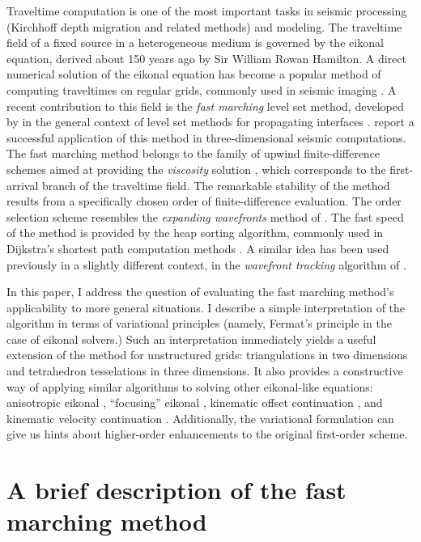 Traveltime computation is one of the most important tasks in seismic
processing (Kirchhoff depth migration and related methods) and modeling.  The
traveltime field of a fixed source in a heterogeneous medium is governed by
the eikonal equation, derived about 150 years ago by Sir William Rowan
Hamilton. A direct numerical solution of the eikonal equation has become a
popular method of computing traveltimes on regular grids, commonly used in
seismic imaging \cite[]{GEO55-05-05210526,GEO56-06-08120821,podvin.gji.91}. A
recent contribution to this field is the \emph{fast marching} level set
method, developed by \cite{paper2} in the general context of level set methods
for propagating interfaces \cite[]{osher,book}. \cite{mihai} report a
successful application of this method in three-dimensional seismic
computations. The fast marching method belongs to the family of upwind
finite-difference schemes aimed at providing the \emph{viscosity} solution
\cite[]{lions}, which corresponds to the first-arrival branch of the
traveltime field. The remarkable stability of the method results from a
specifically chosen order of finite-difference evaluation.  The order
selection scheme resembles the \emph{expanding wavefronts} method of
\cite{GEO57-03-04780487}.  The fast speed of the method is provided by the
heap sorting algorithm, commonly used in Dijkstra's shortest path computation
methods \cite[]{mit}. A similar idea has been used previously in a slightly
different context, in the \emph{wavefront tracking} algorithm of
\cite{GEO59-04-06320643}.
\par
In this paper, I address the question of evaluating the fast marching
method's applicability to more general situations. I describe a simple
interpretation of the algorithm in terms of variational principles
(namely, Fermat's principle in the case of eikonal solvers.) Such an
interpretation immediately yields a useful extension of the method for
unstructured grids: triangulations in two dimensions and tetrahedron
tesselations in three dimensions.  It also provides a constructive way
of applying similar algorithms to solving other eikonal-like
equations: anisotropic eikonal \cite[]{SEG-1991-1530}, ``focusing''
eikonal \cite[]{Biondi.sep.95.biondo1}, kinematic offset continuation
\cite[]{Fomel.sep.84.179}, and kinematic velocity continuation
\cite[]{Fomel.sep.92.159}. Additionally, the variational formulation can
give us hints about higher-order enhancements to the original
first-order scheme.

\section{A brief description of the fast marching method}

